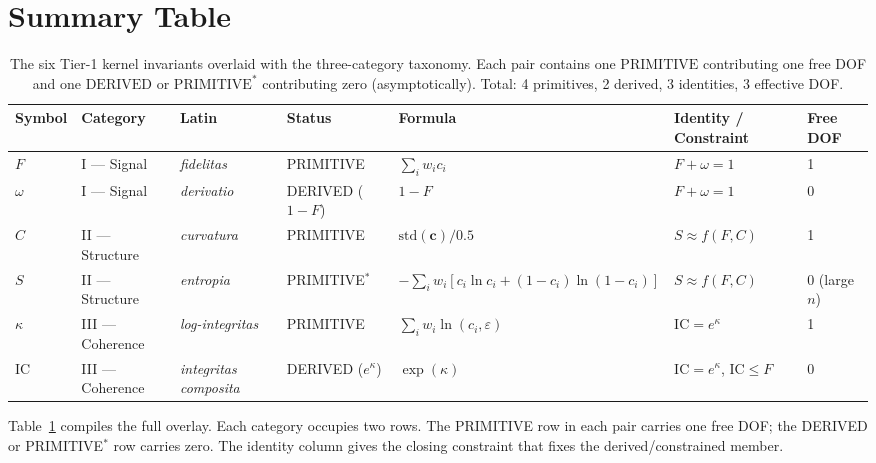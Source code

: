 \documentclass[
  aps,
  prd,
  twocolumn,
  superscriptaddress,
  nofootinbib,
  floatfix
]{revtex4-2}
\newcommand{\eps}{\varepsilon}
\newcommand{\tvec}{\mathbf{c}}
\newcommand{\IC}{\mathrm{IC}}
\newcommand{\stddev}{\mathrm{std}}
\begin{document}
\section{Summary Table}\label{sec:summary}

\begin{table}[t]
\caption{The six Tier-1 kernel invariants overlaid with the three-category
taxonomy.  Each pair contains one $\mathrm{PRIMITIVE}$ contributing one free
DOF and one $\mathrm{DERIVED}$ or $\mathrm{PRIMITIVE}^{*}$ contributing
zero (asymptotically).  Total: 4 primitives, 2 derived, 3 identities,
3 effective DOF.}
\label{tab:summary}
\begin{ruledtabular}
\begin{tabular}{l l l l l l l}
Symbol & Category & Latin & Status & Formula & Identity / Constraint & Free DOF \\
\hline
$F$       & I --- Signal     & \emph{fidelitas}        & PRIMITIVE         & $\sum_i w_i c_i$ & $F+\omega=1$ & 1 \\
$\omega$  & I --- Signal     & \emph{derivatio}        & DERIVED ($1{-}F$) & $1-F$            & $F+\omega=1$ & 0 \\
$C$       & II --- Structure & \emph{curvatura}        & PRIMITIVE         & $\stddev(\tvec)/0.5$ & $S\approx f(F,C)$ & 1 \\
$S$       & II --- Structure & \emph{entropia}         & PRIMITIVE$^{*}$   & $-\sum_i w_i[c_i\ln c_i+(1{-}c_i)\ln(1{-}c_i)]$ & $S\approx f(F,C)$ & 0 (large $n$) \\
$\kappa$  & III --- Coherence & \emph{log-integritas}   & PRIMITIVE         & $\sum_i w_i\ln(c_i,\eps)$ & $\IC=e^{\kappa}$ & 1 \\
$\IC$     & III --- Coherence & \emph{integritas composita} & DERIVED ($e^{\kappa}$) & $\exp(\kappa)$ & $\IC=e^{\kappa}$, $\IC\le F$ & 0 \\
\end{tabular}
\end{ruledtabular}
\end{table}

Table~\ref{tab:summary} compiles the full overlay.  Each category
occupies two rows.  The PRIMITIVE row in each pair carries one
free DOF; the DERIVED or PRIMITIVE$^{*}$ row carries zero.  The
identity column gives the closing constraint that fixes the
derived/constrained member.

\end{document}
